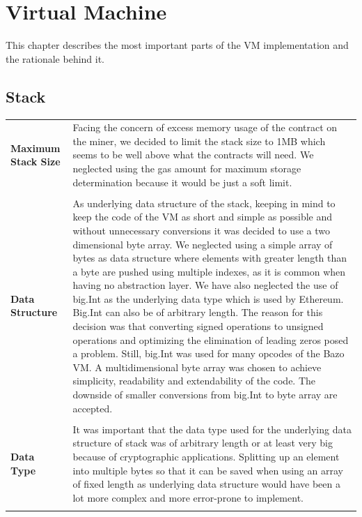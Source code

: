 
\section{Virtual Machine}
This chapter describes the most important parts of the VM implementation and the rationale behind it.

\subsection{Stack}
\begin{tabular}[t]{ p{3cm} p{12.5cm}}
\raggedright
\textbf{Maximum Stack Size} &
Facing the concern of excess memory usage of the contract on the miner, we decided to limit the stack size to 1MB which seems to be well above what the contracts will need. We neglected using the gas amount for maximum storage determination because it would be just a soft limit. \\ \\

\raggedright
\textbf{Data Structure} &
As underlying data structure of the stack, keeping in mind to keep the code of the VM as short and simple as possible and without unnecessary conversions it was decided to use a two dimensional byte array. We neglected using a simple array of bytes as data structure where elements with greater length than a byte are pushed using multiple indexes, as it is common when having no abstraction layer. We have also neglected the use of big.Int as the underlying data type which is used by Ethereum. Big.Int can also be of arbitrary length. The reason for this decision was that converting signed operations to unsigned operations and optimizing the elimination of leading zeros posed a problem. Still, big.Int was used for many opcodes of the Bazo VM. A multidimensional byte array was chosen to achieve simplicity, readability and extendability of the code. The downside of smaller conversions from big.Int to byte array are accepted. \\ \\

\raggedright
\textbf{Data Type} &
It was important that the data type used for the underlying data structure of stack was of arbitrary length or at least very big because of cryptographic applications. Splitting up an element into multiple bytes so that it can be saved when using an array of fixed length as underlying data structure would have been a lot more complex and more error-prone to implement. \\ \\


\end{tabular}
